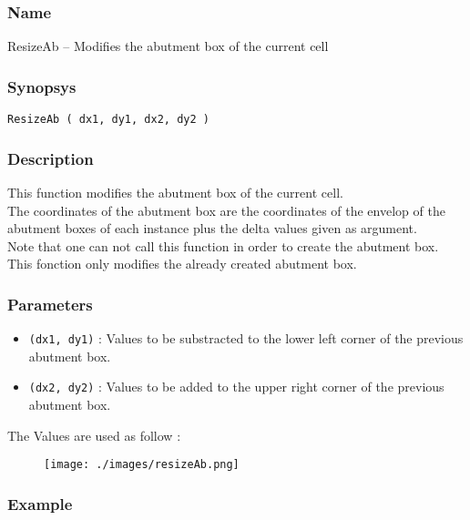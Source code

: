\subsubsection{Name}

ResizeAb -- Modifies the abutment box of the current cell

\subsubsection{Synopsys}

\begin{verbatim}
ResizeAb ( dx1, dy1, dx2, dy2 )
\end{verbatim}

\subsubsection{Description}

This function modifies the abutment box of the current cell.\\
\indent The coordinates of the abutment box are the coordinates of the envelop of the abutment boxes of each instance plus the delta values given as argument.\\

\indent Note that one can not call this function in order to create the abutment box. This fonction only modifies the already created abutment box.
    
\subsubsection{Parameters}

\begin{itemize}
    \item \verb-(dx1, dy1)- : Values to be substracted to the lower left corner of the previous abutment box.
    \item \verb-(dx2, dy2)- : Values to be added to the upper right corner of the previous abutment box.
\end{itemize}

\indent The Values are used as follow :
\begin{figure}[h!]
\centering
\texttt{[image: ./images/resizeAb.png]}
\end{figure}
      
\subsubsection{Example}

